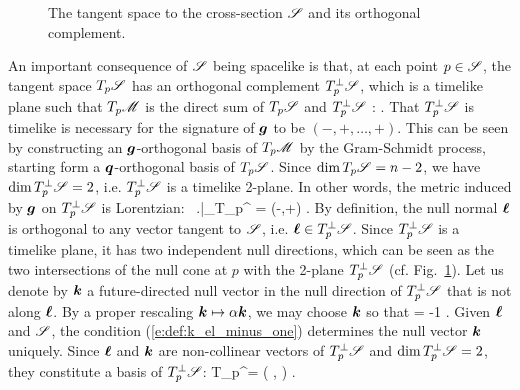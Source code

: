 \begin{figure}
\vspace{5cm}
\caption[]{\label{f:def:TS_ortho} \footnotesize
The tangent space to the cross-section $\mathscr{S}$ and its orthogonal complement.}
\end{figure}

An important consequence of $\mathscr{S}$ being spacelike is that, at each point
$p\in \mathscr{S}$, the tangent space $T_p\mathscr{S}$ has an orthogonal complement
$T_p^\perp\mathscr{S}$,  which is a timelike plane such that
$T_p\mathscr{M}$ is the direct sum of $T_p\mathscr{S}$ and $T_p^\perp\mathscr{S}$ :
\be \label{e:def:TM_direct_sum}
   .
\ee
That $T_p^\perp\mathscr{S}$ is timelike is necessary for the signature of $\bm{g}$
to be $(-,+,\ldots,+)$. This can be seen by constructing an $\bm{g}$-orthogonal
basis of $T_p\mathscr{M}$ by the Gram-Schmidt process, starting form a
$\bm{q}$-orthogonal basis of $T_p\mathscr{S}$. Since $\dim T_p\mathscr{S} = n-2$, we have
$\dim T_p^\perp\mathscr{S} = 2$, i.e. $T_p^\perp\mathscr{S}$ is a timelike 2-plane.
In other words, the metric induced by $\bm{g}$ on
$T_p^\perp\mathscr{S}$ is Lorentzian:
\be
    \, \left.\right|_{T_p^\perp\Sp} = (-,+) .
\ee
By definition, the null normal $\bm{\ell}$ is orthogonal to any vector
tangent to $\mathscr{S}$, i.e. $\bm{\ell} \in T_p^\perp\mathscr{S}$.
Since $T_p^\perp\mathscr{S}$ is a timelike plane, it has two independent null directions,
which can be seen as the two intersections of the null cone at $p$ with
the 2-plane $T_p^\perp\mathscr{S}$ (cf. Fig.~\ref{f:def:TS_ortho}).
Let us denote by $\bm{k}$ a future-directed null vector in the null direction of $T_p^\perp\mathscr{S}$
that is not along $\bm{\ell}$. By a proper rescaling $\bm{k}\mapsto \alpha\bm{k}$,
we may choose $\bm{k}$ so that
\be \label{e:def:k_el_minus_one}
        \cdot\wl = -1 .
\ee
Given $\bm{\ell}$ and $\mathscr{S}$, the condition (\ref{e:def:k_el_minus_one})
determines the null vector $\bm{k}$ uniquely.
Since $\bm{\ell}$ and $\bm{k}$ are non-collinear vectors of $T_p^\perp\mathscr{S}$ and
$\dim T_p^\perp\mathscr{S} = 2$, they constitute a basis of $T_p^\perp\mathscr{S}$:
\be \label{e:def:TSperp_Span_k_l}
    T_p^\perp\Sp = \left( \wl,  \right) .
\ee

